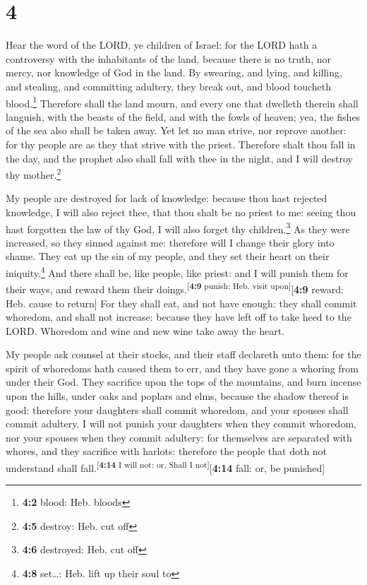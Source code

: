 \hypertarget{section-3}{%
\section{4}\label{section-3}}

 Hear the word of the LORD, ye children of Israel: for the
LORD hath a controversy with the inhabitants of the land, because there
is no truth, nor mercy, nor knowledge of God in the land. 
By swearing, and lying, and killing, and stealing, and committing
adultery, they break out, and blood toucheth blood.\footnote{\textbf{4:2}
  blood: Heb. bloods}  Therefore shall the land mourn, and
every one that dwelleth therein shall languish, with the beasts of the
field, and with the fowls of heaven; yea, the fishes of the sea also
shall be taken away.  Yet let no man strive, nor reprove
another: for thy people are as they that strive with the priest.
 Therefore shalt thou fall in the day, and the prophet
also shall fall with thee in the night, and I will destroy thy
mother.\footnote{\textbf{4:5} destroy: Heb. cut off}

 My people are destroyed for lack of knowledge: because
thou hast rejected knowledge, I will also reject thee, that thou shalt
be no priest to me: seeing thou hast forgotten the law of thy God, I
will also forget thy children.\footnote{\textbf{4:6} destroyed: Heb. cut
  off}  As they were increased, so they sinned against me:
therefore will I change their glory into shame.  They eat
up the sin of my people, and they set their heart on their
iniquity.\footnote{\textbf{4:8} set\ldots: Heb. lift up their soul to}
 And there shall be, like people, like priest: and I will
punish them for their ways, and reward them their
doings.\textsuperscript{{[}\textbf{4:9} punish: Heb. visit
upon{]}}{[}\textbf{4:9} reward: Heb. cause to return{]} 
For they shall eat, and not have enough: they shall commit whoredom, and
shall not increase: because they have left off to take heed to the LORD.
 Whoredom and wine and new wine take away the heart.

 My people ask counsel at their stocks, and their staff
declareth unto them: for the spirit of whoredoms hath caused them to
err, and they have gone a whoring from under their God. 
They sacrifice upon the tops of the mountains, and burn incense upon the
hills, under oaks and poplars and elms, because the shadow thereof is
good: therefore your daughters shall commit whoredom, and your spouses
shall commit adultery.  I will not punish your daughters
when they commit whoredom, nor your spouses when they commit adultery:
for themselves are separated with whores, and they sacrifice with
harlots: therefore the people that doth not understand shall
fall.\textsuperscript{{[}\textbf{4:14} I will not: or, Shall I
not{]}}{[}\textbf{4:14} fall: or, be punished{]}

